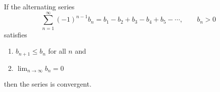 \begin{frame}
\begin{theorem}
If the alternating series
\[
\sum_{n=1}^\infty (-1)^{n-1} b_n = b_1 - b_2 + b_3 - b_4 + b_5 - \cdots , \qquad b_n > 0 
\]
satisfies
\begin{enumerate}
\item  $b_{n+1} \leq b_n$ for all $n$ and
\item  $\lim_{n\to\infty}b_n = 0$
\end{enumerate}
then the series is convergent.
\end{theorem}
\end{frame}

